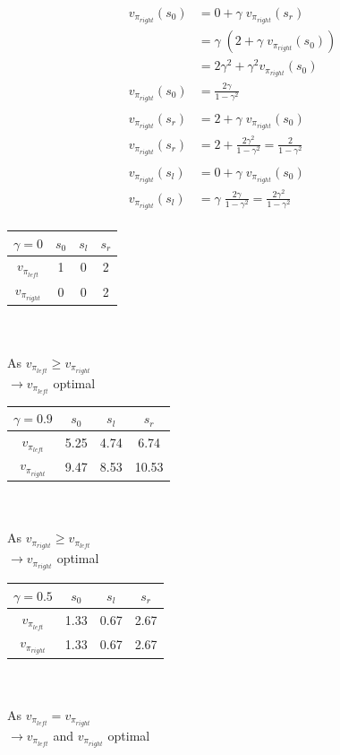 \begin{align*}
v_{\pi_{right}}(s_0) &= 0 + \gamma \; v_{\pi_{right}}(s_r) \\
&= \gamma \; (2 + \gamma \; v_{\pi_{right}}(s_0)) \\
&= 2\gamma^2 + \gamma^2v_{\pi_{right}}(s_0) \\
v_{\pi_{right}}(s_0) &= \frac{2\gamma}{1 - \gamma^2} \\ \\
v_{\pi_{right}}(s_r) &= 2 + \gamma \; v_{\pi_{right}}(s_0) \\
v_{\pi_{right}}(s_r) &= 2 + \frac{2\gamma^2}{1-\gamma^2} = \frac{2}{1-\gamma^2} \\ \\
v_{\pi_{right}}(s_l) &= 0 + \gamma \; v_{\pi_{right}}(s_0) \\
v_{\pi_{right}}(s_l) &= \gamma \; \frac{2\gamma}{1-\gamma^2} = \frac{2\gamma^2}{1-\gamma^2} \\
\end{align*}
\begin{minipage}[t]{.3\textwidth}
\begin{tabular}{c|c|c|c}
$\gamma = 0$& $s_0$ & $s_l$ & $s_r$ \\ 
\hline 
$v_{\pi_{left}}$ & 1 & 0 & 2 \\ 
\hline 
$v_{\pi_{right}}$ & 0 & 0 & 2 \\ 
\end{tabular} 
\\ \\
As $v_{\pi_{left}} \geq v_{\pi_{right}}$ \\
$\rightarrow v_{\pi_{left}}$ optimal
\end{minipage}%
\begin{minipage}[t]{.3\textwidth}
\begin{tabular}{c|c|c|c}
$\gamma=0.9$& $s_0$ & $s_l$ & $s_r$ \\ 
\hline 
$v_{\pi_{left}}$ & 5.25 & 4.74 & 6.74 \\ 
\hline 
$v_{\pi_{right}}$ & 9.47 & 8.53 & 10.53 \\ 
\end{tabular} \\ \\
As $v_{\pi_{right}} \geq v_{\pi_{left}}$ \\
$\rightarrow v_{\pi_{right}}$ optimal
\end{minipage}%
\begin{minipage}[t]{.3\textwidth}
\begin{tabular}{c|c|c|c}
$\gamma = 0.5$ & $s_0$ & $s_l$ & $s_r$ \\ 
\hline 
$v_{\pi_{left}}$ & 1.33 & 0.67 & 2.67 \\ 
\hline 
$v_{\pi_{right}}$ & 1.33 & 0.67 & 2.67 \\ 
\end{tabular}\\ \\
As $v_{\pi_{left}} = v_{\pi_{right}}$ \\
$\rightarrow v_{\pi_{left}}$ and $v_{\pi_{right}}$ optimal
\end{minipage}%

